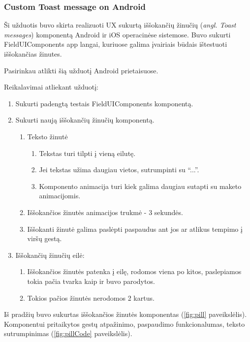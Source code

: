 \newpage
\subsubsection{Custom Toast message on Android}
Ši užduotis buvo skirta realizuoti UX sukurtą iššokančių žinučių (\emph{angl. Toast messages}) komponentą Android ir iOS operacinėse sistemose. 
Buvo sukurti FieldUIComponents app langai, kuriuose galima įvairiais būdais ištestuoti iššokančias žinutes.

Pasirinkau atlikti šią užduotį Android prietaisuose. 

Reikalavimai atliekant užduotį:
\begin{enumerate}
    \item Sukurti padengtą testais FieldUIComponents komponentą.
    \item Sukurti naują iššokančių žinučių komponentą.
    \begin{enumerate}
        \item Teksto žinutė
        \begin{enumerate}
            \item Tekstas turi tilpti į vieną eilutę.
            \item Jei tekstas užima daugiau vietos, sutrumpinti su \enquote{...}.
            \item Komponento animacija turi kiek galima daugiau sutapti su maketo animacijomis.
        \end{enumerate}
        \item Iššokančios žinutės animacijos trukmė - 3 sekundės.
        \item Iššokanti žinutė galima paslėpti paspaudus ant jos ar atlikus tempimo į viršų gestą.
    \end{enumerate}
    \item Iššokančių žinučių eilė:
    \begin{enumerate}
        \item Iššokančios žinutės patenka į eilę, rodomos viena po kitos, paslepiamos tokia pačia tvarka kaip ir buvo parodytos.
        \item Tokios pačios žinutės nerodomos 2 kartus.
    \end{enumerate}
\end{enumerate}
\newpage
Iš pradžių buvo sukurtas iššokančios žinutės komponentas (\ref{fig:pill} paveikslėlis). Komponentui pritaikytos gestų atpažinimo, paspaudimo funkcionalumas, teksto sutrumpinimas (\ref{fig:pillCode} paveikslėlis).

